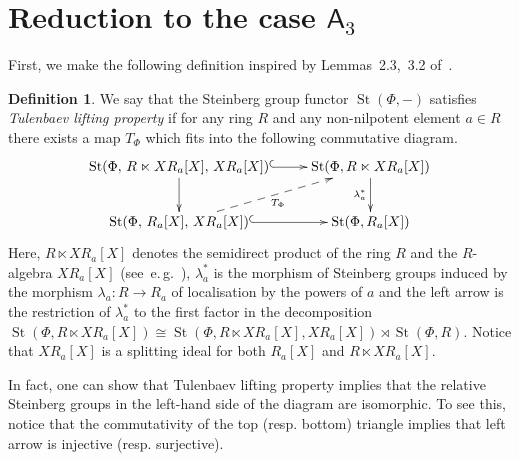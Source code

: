 \documentclass[11pt]{amsart}
\theoremstyle{plain} \declaretheorem[name=Theorem, Refname={Theorem,Theorems}]{tm} \Crefname{tm}{Theorem}{Theorems}
\numberwithin{equation}{section}
\theoremstyle{definition} \newtheorem{df}[lm]{Definition} \Crefname{df}{Definition}{Definitions}
\theoremstyle{remark} \newtheorem{rk}[lm]{Remark} \Crefname{rk}{Remark}{Remarks}
\newcommand{\St}{\mathop{\mathrm{St}}\nolimits}
\newcommand{\rA}{\mathsf{A}}
\begin{document}
\section{Reduction to the case \texorpdfstring{$\rA_3$}{A3}} \label{sec:patching}
First, we make the following definition inspired by Lemmas~2.3,~3.2 of~\cite{Tul}.

\begin{df} \label{df:tlp}
We say that the Steinberg group functor $\St(\Phi, -)$ satisfies {\it Tulenbaev lifting property} if for any ring $R$ and any non-nilpotent element $a \in R$
there exists a map $T_\Phi$ which fits into the following commutative diagram.
\setcounter{equation}{1}
\begin{equation} \xymatrix{\St(\Phi,\,R\ltimes XR_a[X],\,XR_a[X]) \ar@{^{(}->}[r] \ar[d] & \St(\Phi, R \ltimes XR_a[X]) \ar[d]_-{\lambda_a^*} \\
                           \St(\Phi,\,R_a[X],\,XR_a[X]) \ar@{-->}[ru]_-{T_\Phi} \ar@{^{(}->}[r] & \St(\Phi, R_a[X])} \label{eq:diagram} \end{equation}
Here, $R\ltimes XR_a[X]$ denotes the semidirect product of the ring $R$ and the $R$-algebra $XR_a[X]$ 
(see~e.\,g.~\cite[Definition~3.2]{SCh}), $\lambda_a^*$ is the morphism of Steinberg groups induced by the morphism $\lambda_a\colon R \to R_a$ of localisation by the powers of $a$ and 
the left arrow is the restriction of $\lambda_a^*$ to the first factor in the decomposition $\St(\Phi, R \ltimes XR_a[X]) \cong \St(\Phi, R\ltimes XR_a[X], XR_a[X]) \rtimes \St(\Phi, R)$.
Notice that $XR_a[X]$ is a splitting ideal for both $R_a[X]$ and $R \ltimes XR_a[X]$.
\end{df}
In fact, one can show that Tulenbaev lifting property implies that the relative Steinberg groups in the left-hand side of the diagram are isomorphic.
To see this, notice that the commutativity of the top (resp. bottom) triangle implies that left arrow is injective (resp. surjective).
\end{document}
